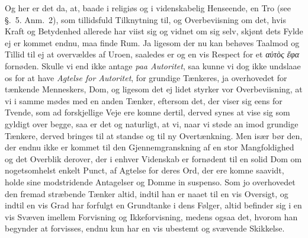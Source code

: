\documentclass[12pt,a4paper]{book}
\newcommand{\apage}[1]{\marginnote{\footnotesize\textit{[#1]}}}
\begin{document}
Og her er det da, at, baade i religiøs og i videnskabelig Henseende, en Tro (see
§.~5. Anm.~2), som tillidsfuld Tilknytning til, og Overbeviisning om det, hvis
Kraft og Betydenhed allerede har viist sig og vidnet om sig selv, skjønt dets Fylde
ej er kommet endnu, maa finde Rum. Ja ligesom der nu kan behøves Taalmod og Tillid
til ej at overvældes af Uroen, saaledes er og en vis Respect for et \emph{αὐτὸς ἔφα}
fornøden.%
 Skulle vi end ikke antage \emph{paa Autoritet}, saa kunne vi dog ikke undslaae os for at
have \emph{Agtelse for Autoritet}, for grundige Tænkeres, ja overhovedet for tænkende
Menneskers, Dom, og ligesom det ej lidet styrker vor Overbeviisning, at vi i samme
mødes med en anden Tænker, eftersom det, der viser sig eens for Tvende, som ad
forskjellige Veje ere komne dertil, derved synes at vise sig som gyldigt over
begge, saa er det og naturligt, at vi, naar vi støde an imod grundige Tænkere,
derved bringes til at standse og til ny Overtænkning. Men især bør den, der endnu
ikke er kommet til den Gjennemgranskning af en stor Mangfoldighed og det Overblik
derover, der i enhver Videnskab er fornødent til en solid Dom om nogetsomhelst
enkelt Punct, af Agtelse for deres Ord, der ere komne saavidt, holde sine
modstridende Antagelser og Domme in suspenso. \apage{192}  Som jo overhovedet den fremad
stræbende Tænker altid, indtil han er naaet til en vis Oversigt, og indtil en vis
Grad har forfulgt en Grundtanke i dens Følger, altid befinder sig i en vis Svæven
imellem Forvisning og Ikkeforvisning, medens ogsaa det, hvorom han begynder at
forvisses, endnu kun har en vis ubestemt og svævende Skikkelse.
\end{document}
